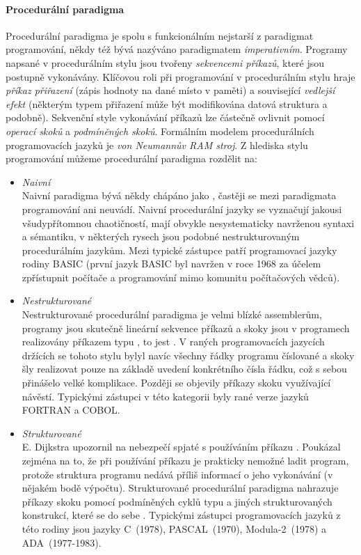 \documentclass[10pt,a4paper]{article}
\begin{document}
    \paragraph{Procedurální paradigma}
      Procedurální paradigma je spolu s funkcionálním nejstarší z paradigmat programování, někdy též bývá nazýváno paradigmatem \textit{imperativním}. Programy napsané v procedurálním stylu jsou tvořeny \textit{sekvencemi příkazů}, které jsou postupně vykonávány. Klíčovou roli při programování v procedurálním stylu hraje \textit{příkaz přiřazení} (zápis hodnoty na dané místo v paměti) a související \textit{vedlejší efekt} (některým typem přiřazení může být modifikována datová struktura a podobně). Sekvenční style vykonávání příkazů lze částečně ovlivnit pomocí \textit{operací skoků} a \textit{podmíněných skoků}. Formálním modelem procedurálních programovacích jazyků je \textit{von Neumannův RAM stroj}. Z hlediska stylu programování můžeme procedurální paradigma rozdělit na:
      \begin{itemize}
        \item \textit{Naivní}\\ Naivní paradigma bývá někdy chápáno jako , častěji se mezi paradigmata programování ani neuvádí. Naivní procedurální jazyky se vyznačují jakousi všudypřítomnou chaotičností, mají obvykle nesystematicky navrženou syntaxi a sémantiku, v některých rysech jsou podobné nestrukturovaným procedurálním jazykům. Mezi typické zástupce patří programovací jazyky rodiny BASIC (první jazyk BASIC byl navržen v roce 1968 za účelem zpřístupnit počítače a programování mimo komunitu počítačových vědců).
        \item \textit{Nestrukturované}\\ Nestrukturované procedurální paradigma je velmi blízké assemblerům, programy jsou skutečně lineární sekvence příkazů a skoky jsou v programech realizovány příkazem typu , to jest . V raných programovacích jazycích držících se tohoto stylu bylyl navíc všechny řádky programu číslované a skoky šly realizovat pouze na základě uvedení konkrétního čísla řádku, což s sebou přinášelo velké komplikace. Později se objevily příkazy skoku využívající návěstí. Typickými zástupci v této kategorii byly rané verze jazyků FORTRAN a COBOL.
        \item \textit{Strukturované}\\ E. Dijkstra upozornil na nebezpečí spjaté s používáním příkazu . Poukázal zejména na to, že při používání příkazu  je prakticky nemožné ladit program, protože struktura programu nedává příliš informací o jeho vykonávání (v nějakém bodě výpočtu). Strukturované procedurální paradigma nahrazuje příkazy skoku pomocí podmíněných cyklů typu  a jiných strukturovaných konstrukcí, které se do sebe . Typickými zástupci programovacích jazyků z této rodiny jsou jazyky C~(1978), PASCAL~(1970), Modula-2~(1978) a ADA~(1977-1983).
      \end{itemize}
\end{document}
